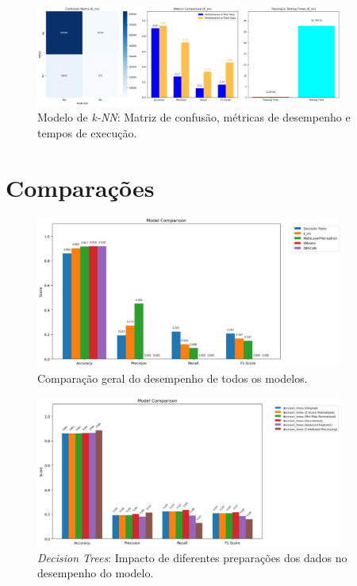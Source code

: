 \begin{figure}[H]
    \centering
    \includegraphics[width=0.9\textwidth]{images/knn_overview.png}
    \caption{Modelo de \textit{k-NN}: Matriz de confusão, métricas de desempenho e tempos de execução.}
    \label{fig:knn_overview}
\end{figure}

\section{Comparações}
\label{chap:comparacoes}

\begin{figure}[H]
    \centering
    \includegraphics[width=0.9\textwidth]{images/model_comparison.png}
    \caption{Comparação geral do desempenho de todos os modelos.}
    \label{fig:model_comparison}
\end{figure}

\begin{figure}[H]
    \centering
    \includegraphics[width=0.9\textwidth]{images/decision_trees_comparison.png}
    \caption{\textit{Decision Trees}: Impacto de diferentes preparações dos dados no desempenho do modelo.}
    \label{fig:decision_trees_comparison}
\end{figure}

